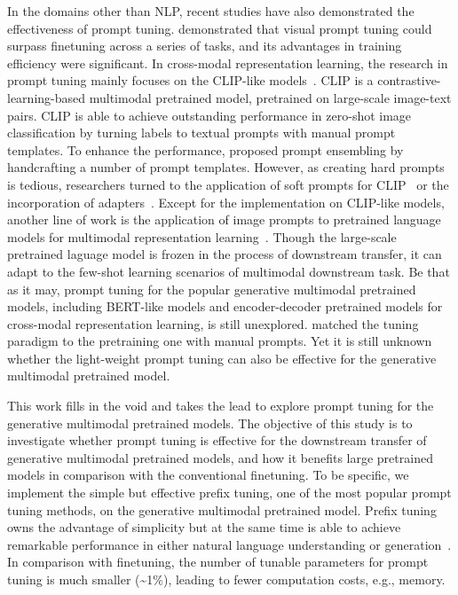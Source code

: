 \documentclass[11pt]{article}
\begin{document}
In the domains other than NLP, recent studies have also demonstrated the effectiveness of prompt tuning. 
\citet{vpt} demonstrated that visual prompt tuning could surpass finetuning across a series of tasks, and its advantages in training efficiency were significant. 
In cross-modal representation learning, the research in prompt tuning mainly focuses on the CLIP-like models~\citep{clip}. 
CLIP is a contrastive-learning-based multimodal pretrained model, pretrained on large-scale image-text pairs. 
CLIP is able to achieve outstanding performance in zero-shot image classification by turning labels to textual prompts with manual prompt templates. 
To enhance the performance, \citet{clip} proposed prompt ensembling by handcrafting a number of prompt templates. 
However, as creating hard prompts is tedious, researchers turned to the application of soft prompts for CLIP~\citep{denseclip, coop, cocoop} or the incorporation of adapters~\citep{clip_adapter, tip_adapter}. 
Except for the implementation on CLIP-like models, another line of work is the application of image prompts to pretrained language models for multimodal representation learning~\citep{cpt, frozen}. 
Though the large-scale pretrained laguage model is frozen in the process of downstream transfer, it can adapt to the few-shot learning scenarios of multimodal downstream task. 
Be that as it may, prompt tuning for the popular generative multimodal pretrained models, including BERT-like models and encoder-decoder pretrained models for cross-modal representation learning, is still unexplored. 
\citet{pevl} matched the tuning paradigm to the pretraining one with manual prompts. 
Yet it is still unknown whether the light-weight prompt tuning can also be effective for the generative multimodal pretrained model. 


This work fills in the void and takes the lead to explore prompt tuning for the generative multimodal pretrained models. 
The objective of this study is to investigate whether prompt tuning is effective for the downstream transfer of generative multimodal pretrained models, and how it benefits large pretrained models in comparison with the conventional finetuning. 
To be specific, we implement the simple but effective prefix tuning, one of the most popular prompt tuning methods, on the generative multimodal pretrained model. Prefix tuning owns the advantage of simplicity but at the same time is able to achieve remarkable performance in either natural language understanding or generation~\citep{prefix_tuning, p_tuning_v2}. 
In comparison with finetuning, the number of tunable parameters for prompt tuning is much smaller (\textasciitilde1\%), leading to fewer computation costs, e.g., memory. 
\end{document}
